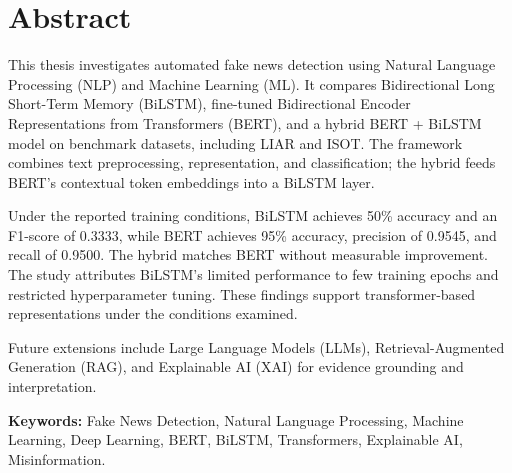 \chapter*{\centering Abstract}
\onehalfspacing
\setlength{\parskip}{6pt}

This thesis investigates automated fake news detection using Natural Language Processing (NLP) and Machine Learning (ML). It compares Bidirectional Long Short-Term Memory (BiLSTM), fine-tuned Bidirectional Encoder Representations from Transformers (BERT), and a hybrid BERT + BiLSTM model on benchmark datasets, including LIAR and ISOT. The framework combines text preprocessing, representation, and classification; the hybrid feeds BERT's contextual token embeddings into a BiLSTM layer.

Under the reported training conditions, BiLSTM achieves 50\% accuracy and an F1-score of 0.3333, while BERT achieves 95\% accuracy, precision of 0.9545, and recall of 0.9500. The hybrid matches BERT without measurable improvement. The study attributes BiLSTM's limited performance to few training epochs and restricted hyperparameter tuning. These findings support transformer-based representations under the conditions examined.

Future extensions include Large Language Models (LLMs), Retrieval-Augmented Generation (RAG), and Explainable AI (XAI) for evidence grounding and interpretation.

\noindent
{\bf Keywords:} Fake News Detection, Natural Language Processing, Machine Learning, Deep Learning, BERT, BiLSTM, Transformers, Explainable AI, Misinformation.

